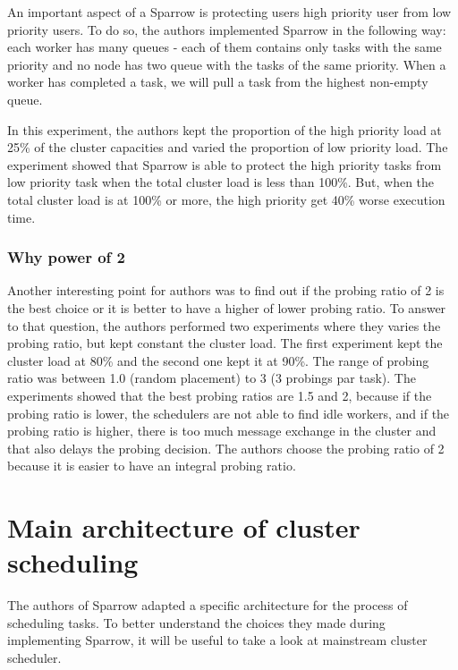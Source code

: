 \documentclass[11pt]{article}
\begin{document}
            An important aspect of a Sparrow is protecting users high priority user from low priority users. To do so, the authors implemented Sparrow in the following way: each worker has many queues - each of them contains only tasks with the same priority and no node has two queue with the tasks of the same priority. When a worker has completed a task, we will pull a task from the highest non-empty queue.
            
            In this experiment, the authors kept the proportion of the high priority load at 25\% of the cluster capacities and varied the proportion of low priority load. The experiment showed that Sparrow is able to protect the high priority tasks from low priority task when the total cluster load is less than 100\%. But, when the total cluster  load is at 100\% or more, the high priority get 40\% worse execution time.
        
        
        \subsubsection*{Why power of 2}
        	\label{probingratio}
        
        	Another interesting point for authors was to find out if the probing ratio of 2 is the best choice or it is better to have a higher of lower probing ratio. To answer to that question, the authors performed two experiments where they varies the probing ratio, but kept constant the cluster load. The first experiment kept the cluster load at 80\% and the second one kept it at 90\%. The range of probing ratio was between 1.0 (random placement) to 3 (3 probings par task). The experiments showed that the best probing ratios are 1.5 and 2, because if the probing ratio is lower, the schedulers are not able to find idle workers, and if the probing ratio is higher, there is too much message exchange in the cluster and that also delays the probing decision. The authors choose the probing ratio of 2 because it is easier to have an integral probing ratio.


\section{Main architecture of cluster scheduling}

	The authors of Sparrow adapted a specific architecture for the process of scheduling tasks. To better understand the choices they made during implementing Sparrow, it will be useful to take a look at mainstream cluster scheduler.
    
\end{document}

